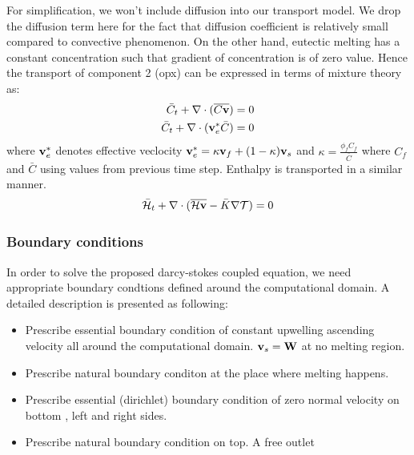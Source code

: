 For simplification, we won't include diffusion into our transport model.
We drop the diffusion term here for the fact that diffusion coefficient is
relatively small compared to convective phenomenon. On the other hand, 
eutectic melting has a constant concentration such that gradient of 
concentration is of zero value. Hence the transport of component 2 (opx) 
can be expressed in terms of mixture theory as:
\begin{equation}
		  \begin{aligned}
					 \bar{C}_t + \nabla \cdot (\overline{C\bold{v}}) &= 0\\
					 \bar{C}_t + \nabla \cdot (\bold{v}_e^* \bar{C}) &= 0
		  \end{aligned}
\end{equation}
where $\bold{v}_e^*$ denotes effective veclocity 
$\bold{v}_e^* = \kappa \bold{v}_f + (1-\kappa)\bold{v}_s$
and $\kappa = \frac{\phi_f C_f}{\bar{C}}$ where $C_f$ and $\bar{C}$ using 
values from previous time step.
Enthalpy is transported in a similar manner.
\begin{equation}
		  \bar{\mathcal{H}}_t + \nabla \cdot (\overline{\mathcal{H}\bold{v}} - 
		  \bar{K}\nabla \mathcal{T})  = 0
\end{equation}

\subsubsection{Boundary conditions}
In order to solve the proposed darcy-stokes coupled equation, 
we need appropriate boundary condtions defined around the computational domain.
A detailed description is presented as following:
\begin{itemize}
		  \item Prescribe essential boundary condition of constant upwelling ascending
					 velocity all around the computational domain. $\bold{v}_s = \bold{W}$
					 at no melting region.
					 \item Prescribe natural boundary conditon at the place where melting 
					 happens. 
	 \item Prescribe essential (dirichlet) boundary condition of zero normal velocity on
	 bottom , left and right sides.
   \item Prescribe natural boundary condition on top. A free outlet 
\end{itemize}

